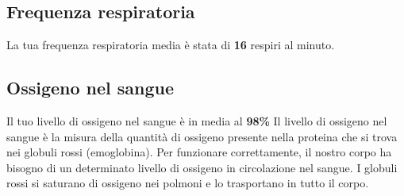 \documentclass{article}
\begin{document}
\subsection{Frequenza respiratoria}
La tua frequenza respiratoria media è stata di \textbf{16} respiri al minuto. 
\subsection{Ossigeno nel sangue}
Il tuo livello di ossigeno nel sangue è in media al \textbf{98\%}
Il livello di ossigeno nel sangue è la misura della quantità di ossigeno presente nella proteina che si trova nei globuli rossi (emoglobina). Per funzionare correttamente, il nostro corpo ha bisogno di un determinato livello di ossigeno in circolazione nel sangue. I globuli rossi si saturano di ossigeno nei polmoni e lo trasportano in tutto il corpo.
\end{document}
